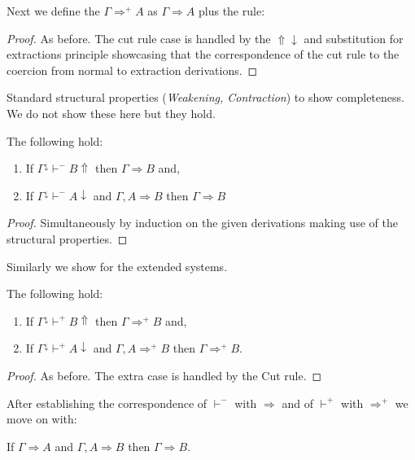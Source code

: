 Next we define the $\Gamma\Rightarrow^{+} A$ as $\Gamma\Rightarrow A$ plus the rule:
\begin{mathpar}
\end{mathpar}
\begin{proof}
As before. The cut rule case is handled by the $\Uparrow\downarrow$ and substitution for extractions principle showcasing that the correspondence of the cut rule to the coercion from normal to extraction derivations.
\end{proof}
Standard structural properties (\textit{Weakening, Contraction}) to show completeness. We do not show these here but they hold.
\begin{theorem} 
	\label{compseqcalc}
	The following hold:
	\begin{enumerate}
		\item If   $\Gamma^\downarrow\vdash^{-} B\Uparrow$ then $\Gamma\Rightarrow B$ and,
		\item 	If $\Gamma^\downarrow \vdash^{-} A\downarrow$ and $\Gamma,A\Rightarrow B$ then $\Gamma\Rightarrow B$   
	\end{enumerate}
\begin{proof}
	Simultaneously by induction on the given derivations making use of the structural properties.
\end{proof}
Similarly we show for the extended systems.
\begin{theorem} The following hold:
	\label{compseqcut}
	\begin{enumerate}
		\item If   $\Gamma^\downarrow\vdash^{+} B\Uparrow$ then  $\Gamma\Rightarrow^{+} B$ and,
		\item 	If $\Gamma^\downarrow \vdash^{+} A\downarrow$ and $\Gamma,A\Rightarrow^{+} B$ then $\Gamma\Rightarrow^{+} B$.   
	\end{enumerate}
\end{theorem}
\begin{proof}
	As before. The extra case is handled by the Cut rule.
\end{proof}
\end{theorem}
After establishing the correspondence of $\vdash^{-}$ with $\Rightarrow$ and of $\vdash^{+}$ with $\Rightarrow^{+}$ we move on with:
\begin{theorem}
	If $\Gamma\Rightarrow A$ and $\Gamma,A\Rightarrow B$ then $\Gamma\Rightarrow B$.
\end{theorem}
